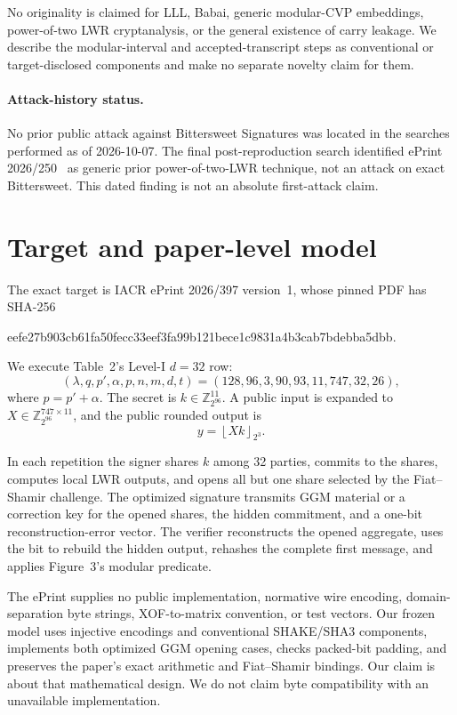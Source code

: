 \documentclass[10pt,a4paper]{article}
\newcommand{\Z}{\mathbb{Z}}
\newcommand{\roundp}[2]{\left\lfloor #1 \right\rfloor_{2^{#2}}}
\begin{document}
No originality is claimed for LLL, Babai, generic modular-CVP embeddings,
power-of-two LWR cryptanalysis, or the general existence of carry leakage.
We describe the modular-interval and accepted-transcript steps as conventional
or target-disclosed components and make no separate novelty claim for them.

\paragraph{Attack-history status.}
No prior public attack against Bittersweet Signatures was located in the
searches performed as of 2026-10-07.  The final post-reproduction search
identified ePrint 2026/250~\cite{powertwolwr} as generic prior
power-of-two-LWR technique, not an attack on exact Bittersweet.  This dated
finding is not an absolute first-attack claim.

\section{Target and paper-level model}

The exact target is IACR ePrint 2026/397 version~1, whose pinned PDF has
SHA-256
\begin{center}
\small\ttfamily eefe27b903cb61fa50fecc33eef3fa99b121bece1c9831a4b3cab7bdebba5dbb.
\end{center}
We execute Table~2's Level-I $d=32$ row:
\[
(\lambda,q,p',\alpha,p,n,m,d,t)
=(128,96,3,90,93,11,747,32,26),
\]
where $p=p'+\alpha$.  The secret is $k\in\Z_{2^{96}}^{11}$.  A public input is
expanded to $X\in\Z_{2^{96}}^{747\times 11}$, and the public rounded output is
\[
                 y=\roundp{Xk}{3}.
\]

In each repetition the signer shares $k$ among 32 parties, commits to the
shares, computes local LWR outputs, and opens all but one share selected by the
Fiat--Shamir challenge.  The optimized signature transmits GGM material or a
correction key for the opened shares, the hidden commitment, and a one-bit
reconstruction-error vector.  The verifier reconstructs the opened aggregate,
uses the bit to rebuild the hidden output, rehashes the complete first message,
and applies Figure~3's modular predicate.

The ePrint supplies no public implementation, normative wire encoding,
domain-separation byte strings, XOF-to-matrix convention, or test vectors.  Our
frozen model uses injective encodings and conventional SHAKE/SHA3 components,
implements both optimized GGM opening cases, checks packed-bit padding, and
preserves the paper's exact arithmetic and Fiat--Shamir bindings.  Our claim is
about that mathematical design.  We do not claim byte compatibility with an
unavailable implementation.
\end{document}
